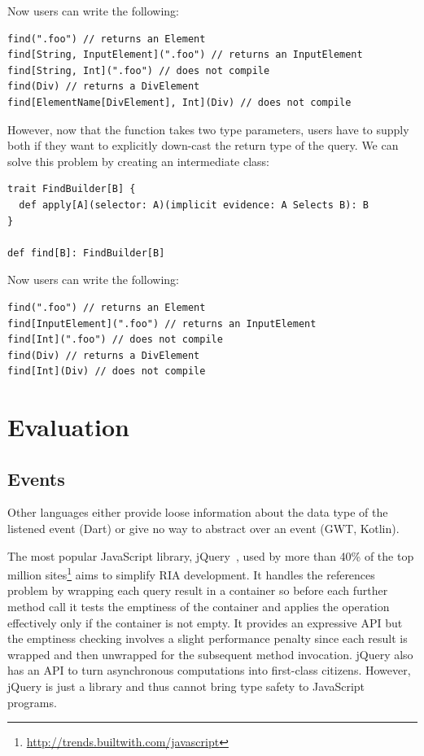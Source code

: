 \documentclass[runningheads,a4paper]{llncs}
\begin{document}
Now users can write the following:

\begin{lstlisting}
find(".foo") // returns an Element
find[String, InputElement](".foo") // returns an InputElement
find[String, Int](".foo") // does not compile
find(Div) // returns a DivElement
find[ElementName[DivElement], Int](Div) // does not compile
\end{lstlisting}

However, now that the  function takes two type parameters, users have to supply both
if they want to explicitly down-cast the return type of the query. We can solve this problem by
creating an intermediate class:

\begin{lstlisting}
trait FindBuilder[B] {
  def apply[A](selector: A)(implicit evidence: A Selects B): B
}

def find[B]: FindBuilder[B]
\end{lstlisting}

Now users can write the following:

\begin{lstlisting}
find(".foo") // returns an Element
find[InputElement](".foo") // returns an InputElement
find[Int](".foo") // does not compile
find(Div) // returns a DivElement
find[Int](Div) // does not compile
\end{lstlisting}


\section{Evaluation}

\subsection{Events}


Other languages either provide loose information about the data type of the listened event (Dart) or
give no way to abstract over an event (GWT, Kotlin).

The most popular JavaScript library, jQuery~\cite{Bibeault08_jQuery}, used by more than 40\% of the top million
sites\footnote{\href{http://trends.builtwith.com/javascript}{http://trends.builtwith.com/javascript}} aims to
simplify RIA development. It handles the  references problem by wrapping each query result in a container
so before each further method call it tests the emptiness of the container and applies the operation effectively only
if the container is not empty. It provides an expressive API but the emptiness checking involves a slight performance
penalty since each result is wrapped and then unwrapped for the subsequent method invocation. jQuery also has an API
to turn asynchronous computations into first-class citizens. However, jQuery is just a library and thus cannot bring
type safety to JavaScript programs.
\end{document}
